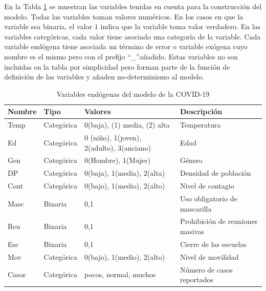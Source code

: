 En la Tabla \ref{tab:variables} se muestran las variables tenidas en cuenta para la construcción del modelo. Todas las variables toman valores numéricos. En los casos en que la variable sea binaria, el valor $1$ indica que la variable toma valor verdadero. En las variables categóricas, cada valor tiene asociado una categoría de la variable. Cada variable endógena tiene asociada un término de error o variable exógena cuyo nombre es el mismo pero con el prefijo \textquotedblleft\_\textquotedblright añadido. Estas variables no son incluidas en la tabla por simplicidad pero forman parte de la función de definición de las variables y añaden no-determinismo al modelo.
\begin{table}
	\begin{tabular}{| m{1.5cm} | m{2cm} | m{5cm}| m{3cm} |}
		\hline
		Nombre & Tipo & Valores & Descripción \\
		\hline
		Temp & Categórica & 0(baja), (1) media, (2) alta & Temperatura \\
		\hline
		Ed & Categórica & 0 (niño), 1(joven), 2(adulto), 3(anciano) & Edad \\
		\hline
		Gen & Categórica & 0(Hombre), 1(Mujer) & Género \\
		\hline
		DP & Categórica & 0(baja), 1(media), 2(alta) & Densidad de población \\
		\hline
		Cont & Categórica & 0(bajo), 1(medio), 2(alto) & Nivel de contagio \\
		\hline
		Masc & Binaria & 0,1 & Uso obligatorio de mascarilla \\
		\hline
		Reu & Binaria & 0,1 & Prohibición de reuniones masivas \\
		\hline
		Esc & Binaria & 0,1 & Cierre de las escuelas \\
		\hline
		Mov & Categórica & 0(bajo), 1(medio), 2(alto) & Nivel de movilidad \\
		\hline
		Casos & Categórica & pocos, normal, muchos & Número de casos reportados \\
		\hline
	\end{tabular}
	\caption{Variables endógenas del modelo de la COVID-19}
	\label{tab:variables}	
\end{table}


